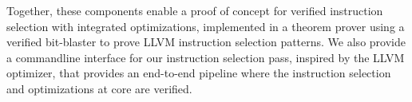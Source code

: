 \documentclass[review, anonymous, acmsmall, screen]{acmart}
\begin{document}
Together, these components enable a proof of concept for verified instruction selection with 
integrated optimizations, implemented in a theorem prover using a verified bit-blaster to prove LLVM 
instruction selection patterns. We also provide a commandline interface for our instruction 
selection pass, inspired by the LLVM optimizer, that provides an end-to-end pipeline where the 
instruction selection and optimizations at core are verified.










%

\end{document}
